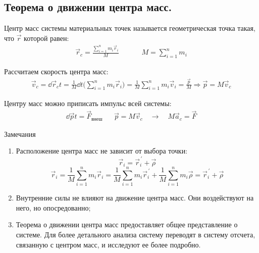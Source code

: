 \subsection{\textbf{Теорема о движении центра масс.}}

Центр масс системы материальных точек называется геометрическая точка такая, что $\vec{r}$ которой равен:
\[\begin{aligned}
	\vec{r}_c = \frac{\sum_{i=1}^{n} m_i \vec{r}_i}{M} &&&& M = \sum_{i=1}^{n} m_i
\end{aligned}\]

Рассчитаем скорость центра масс:
\begin{multline*}
	\vec{v}_c = \dd{\vec{r}_c}{t} = \frac{1}{M} \dd{}{t} \Big(\sum_{i=1}^{n} m_i \vec{r}_{i}\Big) = \frac{1}{M} \sum_{i=1}^{n} m_i \vec{v}_i = \frac{\vec{p}}{M} \Rightarrow \boxed{\vec{p} = M \vec{v}_c}
\end{multline*}

Центру масс можно приписать импульс всей системы:
\begin{align*}
	\dd{\vec{p}}{t} = \vec{F}_{\text{внеш}} && \vec{p} = M\vec{v}_c \quad\to\quad M\vec{a}_c = \vec{F}
\end{align*}

\begin{tbox}{Замечания}
	\begin{enumerate}
		\item Расположение центра масс не зависит от выбора точки:
		\[\vec{r}_i = \vec{r}_i^{\,\prime} + \vec{\rho}\]
		\[\vec{r}_i = \frac{1}{M} \sum_{i=1}^{n} m_i \vec{r}_i = \frac{1}{M} \sum_{i=1}^n m_i \vec{r}_i^{\,\prime} + \frac{1}{M} \sum_{i=1}^{n} m_i \vec{\rho} = \vec{r}_i^{\,\prime} + \vec{\rho}\]
		\item Внутренние силы не влияют на движение центра масс. Они воздействуют на него, но опосредованно;
		\item Теорема о движении центра масс предоставляет общее представление о системе. Для более детального анализа систему переводят в систему отсчета, связанную с центром масс, и исследуют ее более подробно.
	\end{enumerate}
\end{tbox}